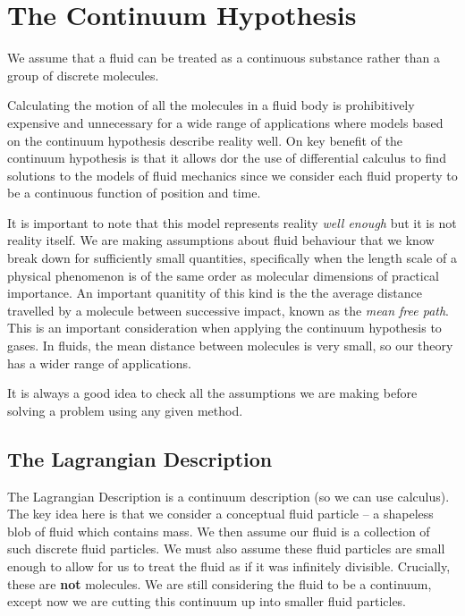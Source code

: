 \section{The Continuum Hypothesis}

\begin{proposition}
  We assume that a fluid can be treated as a continuous substance rather than a group of discrete molecules.
\end{proposition}

Calculating the motion of all the molecules in a fluid body is prohibitively expensive and unnecessary for a wide range of applications where models based on the continuum hypothesis describe reality well. On key benefit of the continuum hypothesis is that it allows dor the use of differential calculus to find solutions to the models of fluid mechanics since we consider each fluid property to be a continuous function of position and time.

It is important to note that this model represents reality \textit{well enough} but it is not reality itself. We are making assumptions about fluid behaviour that we know break down for sufficiently small quantities, specifically when the length scale of a physical phenomenon is of the same order as molecular dimensions of practical importance. An important quanitity of this kind is the the average distance travelled by a molecule between successive impact, known as the \textit{mean free path}. This is an important consideration when applying the continuum hypothesis to gases. In fluids, the mean distance between molecules is very small, so our theory has a wider range of applications.

It is always a good idea to check all the assumptions we are making before solving a problem using any given method.

\subsection*{The Lagrangian Description}

The Lagrangian Description is a continuum description (so we can use calculus). The key idea here is that we consider a conceptual fluid particle -- a shapeless blob of fluid which contains mass. We then assume our fluid is a collection of such discrete fluid particles. We must also assume these fluid particles are small enough to allow for us to treat the fluid as if it was infinitely divisible. Crucially, these are \textbf{not} molecules. We are still considering the fluid to be a continuum, except now we are cutting this continuum up into smaller fluid particles.

